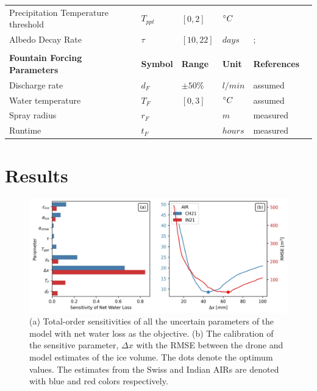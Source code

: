 \documentclass[utf8]{frontiersSCNS}
\begin{document}
\begin{table}[h!]
\begin{tabular}{@{}llllll@{}}
    Precipitation Temperature threshold & $T_{ppt}$             & $[0,2]$            & $\degree C$& \citeauthor{Zhou_2010}  \\
    Albedo Decay Rate                   & $\tau$                & $[10,22]$           & $days$ &
    \citeauthor{Schmidt_2017};      \\
    & &    &  & \citeauthor{OerlemansKnap_1998}      \\\midrule
		\textbf{Fountain Forcing Parameters} & \textbf{Symbol} & \textbf{Range} & \textbf{Unit} & \textbf{References} \\\midrule
    Discharge rate & $d_{F}$             & $\pm 50 \%$            & $l/min$& assumed  \\
    Water temperature & $T_{F}$             & $[0,3]$            & $\degree C$  & assumed  \\
    Spray radius & $r_{F}$             &             & $m$& measured \\
    Runtime & $t_{F}$             &             &  $hours$ & measured \\\bottomrule
	\end{tabular}
\end{table}

\section{Results}

\begin{figure}
	\begin{center}
		\includegraphics[width=\linewidth]{Figures/Figure_5.jpg}
	\end{center}
  \caption{(a) Total-order sensitivities of all the uncertain parameters of the model with net water loss as the
  objective. (b) The calibration of the sensitive parameter, $\Delta x$ with the RMSE between the drone and
model estimates of the ice volume. The dots denote the optimum values. The estimates from the Swiss and Indian
AIRs are denoted with blue and red colors respectively. }

	\label{fig:param_hist}
\end{figure}
\end{document}
